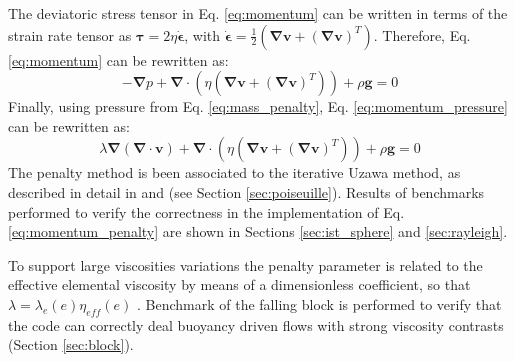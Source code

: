 \documentclass[hidelinks,10pt,a4paper]{article}
\begin{document}
The deviatoric stress tensor in Eq. \ref{eq:momentum} can be written in terms of the strain rate tensor as $\bm{\tau}=2\eta\dot{\bm{\epsilon}}$, with
$\dot{\bm{\epsilon}}=\frac{1}{2}\left(\bm{\nabla}\bm{v}+(\bm{\nabla}\bm{v})^T\right)$. Therefore, Eq. \ref{eq:momentum} can be rewritten as:
\begin{equation}\label{eq:momentum_pressure}
-\bm{\nabla} p + \bm{\nabla} \cdot \left(\eta \left(\bm{\nabla}\bm{v}+(\bm{\nabla}\bm{v})^T\right)\right) + \rho \bm{g} = 0
\end{equation}
Finally, using pressure from Eq. \ref{eq:mass_penalty}, Eq. \ref{eq:momentum_pressure} can be rewritten as:
\begin{equation}\label{eq:momentum_penalty}
\lambda \bm{\nabla} \left(\bm{\nabla} \cdot \bm{v}\right)+\bm{\nabla} \cdot \left(\eta \left(\bm{\nabla}\bm{v}+(\bm{\nabla}\bm{v})^T\right)\right)+\rho\bm{g}=0
\end{equation}
The penalty method is been associated to the iterative Uzawa method, as described in detail in \citet{Dabrowski2008} and \citet{Thieulot2014}
(see Section \ref{sec:poiseuille}). Results of benchmarks performed to verify the correctness in the implementation of Eq. \ref{eq:momentum_penalty} are
shown in Sections \ref{sec:ist_sphere} and \ref{sec:rayleigh}.

To support large viscosities variations the penalty parameter is related to the effective elemental viscosity by means of a dimensionless coefficient, so that
$\lambda=\lambda_e(e)\eta_{eff}(e)$ \citep{Marotta2006,Dabrowski2008,Thieulot2014}. Benchmark of the falling block \citep{Gerya2003a,Gerya2010b,Thieulot2011}
is performed to verify that the code can correctly deal buoyancy driven flows with strong viscosity contrasts (Section \ref{sec:block}).
\end{document}
